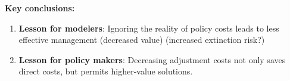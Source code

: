 \documentclass{article}\usepackage{graphicx, color}
\begin{document}
\textbf{Key conclusions:}
\begin{enumerate}
  \item \textbf{Lesson for modelers}: Ignoring the reality of policy costs leads to less effective management (decreased value)  (increased extinction risk?)
  \item \textbf{Lesson for policy makers}: Decreasing adjustment costs not only saves direct costs, but permits higher-value solutions.
\end{enumerate}
\end{document}
